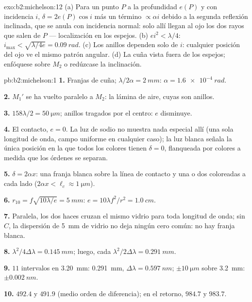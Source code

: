 \begin{solution}{exo:b2:michelson:12}
(a) Para un punto $P$ a la profundidad $e(P)$ y con incidencia $i$, $\delta = 2e(P)\cos i$
más un término $\propto\alpha i$ debido a la segunda reflexión inclinada, que
se anula con incidencia normal: solo allí llegan al ojo los dos rayos que salen de $P$
--- localización en los espejos. (b) $ei^2 < \lambda/4$: $i_{\max} <
\sqrt{\lambda/4e} = \qty{0.09}{rad}$. (c) Los anillos dependen solo de $i$: cualquier posición
del ojo ve el mismo patrón angular. (d) La cuña vista fuera de los
espejos; enfóquese sobre $M_2$ o redúzcase la inclinación.
\end{solution}

\begin{solution}{pb:b2:michelson:1}
\textbf{1.} Franjas de cuña; $\lambda/2\alpha = \qty{2}{mm}$: $\alpha = \qty{1.6e-4}{rad}$.

\textbf{2.} $M_1'$ se ha vuelto paralelo a $M_2$: la lámina de aire, cuyas
 son anillos.

\textbf{3.} $158\lambda/2 = \qty{50}{\micro m}$; anillos tragados por el centro: $e$
disminuye.

\textbf{4.} El contacto, $e = 0$. La luz de sodio no muestra nada especial allí (una
sola longitud de onda, campo uniforme en cualquier caso); la luz blanca señala la única
posición en la que todos los colores tienen $\delta = 0$, flanqueada por colores a medida que los
órdenes se separan.

\textbf{5.} $\delta = 2\alpha x$: una franja blanca sobre la línea de contacto y una o
dos coloreadas a cada lado ($2\alpha x < \ell_c \approx \qty{1}{\micro m}$).

\textbf{6.} $r_{10} = f\sqrt{10\lambda/e} = \qty{5}{mm}$: $e = 10\lambda f^2/r^2 = \qty{1.0}{cm}$.

\textbf{7.} Paralela, los dos haces cruzan el mismo vidrio para toda
longitud de onda; sin $C$, la dispersión de \qty{5}{mm} de vidrio no deja ningún
cero común: no hay franja blanca.

\textbf{8.} $\lambda^2/4\Delta\lambda = \qty{0.145}{mm}$; luego, cada $\lambda^2/2\Delta\lambda = \qty{0.291}{mm}$.

\textbf{9.} $11$ intervalos en \qty{3.20}{mm}: \qty{0.291}{mm}, $\Delta\lambda = \qty{0.597}{nm}$;
$\pm\qty{10}{\micro m}$ sobre \qty{3.2}{mm}: $\pm\qty{0.002}{nm}$.

\textbf{10.} $492.4$ y $491.9$ (medio orden de diferencia); en el retorno,
$984.7$ y $983.7$.


\end{solution}
